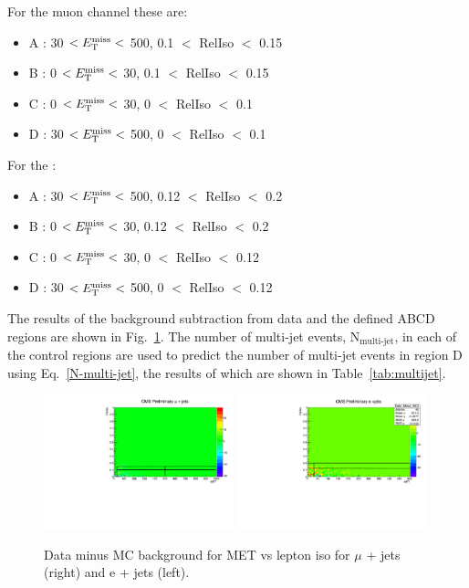 For the muon channel these are:
\begin{itemize}
\setlength\itemsep{0em}
\item A : 30 $<E_{\mathrm{T}}^{\text{miss}}<$ 500, 0.1 $<$ RelIso $<$ 0.15
\item B : 0 $<E_{\mathrm{T}}^{\text{miss}}<$ 30, 0.1 $<$ RelIso $<$ 0.15
\item C : 0 $<E_{\mathrm{T}}^{\text{miss}}<$ 30, 0 $<$ RelIso $<$ 0.1
\item D : 30 $<E_{\mathrm{T}}^{\text{miss}}<$ 500, 0 $<$ RelIso $<$ 0.1
\end{itemize}
For the \eplusjets:
\begin{itemize}
\itemsep0em
\item A : 30 $<E_{\mathrm{T}}^{\text{miss}}<$ 500, 0.12 $<$ RelIso $<$ 0.2
\item B : 0 $<E_{\mathrm{T}}^{\text{miss}}<$ 30, 0.12 $<$ RelIso $<$ 0.2
\item C : 0 $<E_{\mathrm{T}}^{\text{miss}}<$ 30, 0 $<$ RelIso $<$ 0.12
\item D : 30 $<E_{\mathrm{T}}^{\text{miss}}<$ 500, 0 $<$ RelIso $<$ 0.12
\end{itemize}

The results of the background subtraction from data and the defined ABCD regions are shown in Fig.~\ref{fig:QCDplots}.
The number of multi-jet events, N$_{\textrm{multi-jet}}$, in each of the control regions are used to predict the number of multi-jet events in region D using Eq.~\ref{N-multi-jet}, the results of which are shown in Table~\ref{tab:multijet}.

\begin{figure}[!ht]
    \includegraphics[width=0.49\textwidth]{images/Run1/Data_Minus_MC_Mu_Lines.pdf}
    \includegraphics[width=0.49\textwidth]{images/Run1/Data_Minus_MC_El_Lines.pdf}
    \caption{Data minus MC background for MET vs lepton iso for $\mu$ + jets (right) and e + jets (left).}
    \label{fig:QCDplots}
\end{figure}



